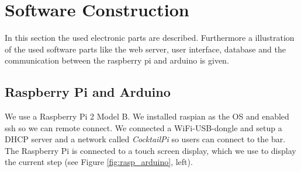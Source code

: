 \documentclass{acm_proc_article-sp}
\begin{document}
\begin{minipage}{\linewidth}%
\label{fig:soldering}%
\end{minipage}



\section{Software Construction}
In this section the used electronic parts are described. Furthermore a illustration of the used software parts like the web server, user interface, database and the communication between the raspberry pi and arduino is given.

\subsection{Raspberry Pi and Arduino}
We use a Raspberry Pi 2 Model B. We installed raspian as the OS and enabled ssh so we can remote connect. We connected a WiFi-USB-dongle and setup a DHCP server and a network called \textit{CocktailPi} so users can connect to the bar. The Raspberry Pi is connected to a touch screen display, which we use to display the current step (see Figure \ref{fig:rasp_arduino}, left).
\end{document}
